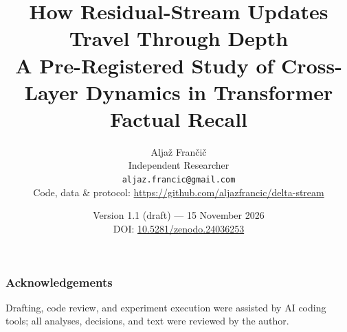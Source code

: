 \documentclass[11pt,a4paper]{article}
\title{\textbf{How Residual-Stream Updates Travel Through Depth}\\[1.2ex]
  {\large A Pre-Registered Study of Cross-Layer Dynamics in Transformer
  Factual Recall}}
\author{Alja\v{z} Fran\v{c}i\v{c}\\
  Independent Researcher\\
  \texttt{aljaz.francic@gmail.com}\\[1ex]
  {\small Code, data \& protocol: \url{https://github.com/aljazfrancic/delta-stream}}}
\date{Version 1.1 (draft) --- 15 November 2026\\[0.5ex]
  {\small DOI: \href{https://doi.org/10.5281/zenodo.24036253}{10.5281/zenodo.24036253}}}
\begin{document}
\maketitle












\subsubsection*{Acknowledgements}
Drafting, code review, and experiment execution were assisted by AI coding
tools; all analyses, decisions, and text were reviewed by the author.




\appendix

\end{document}

